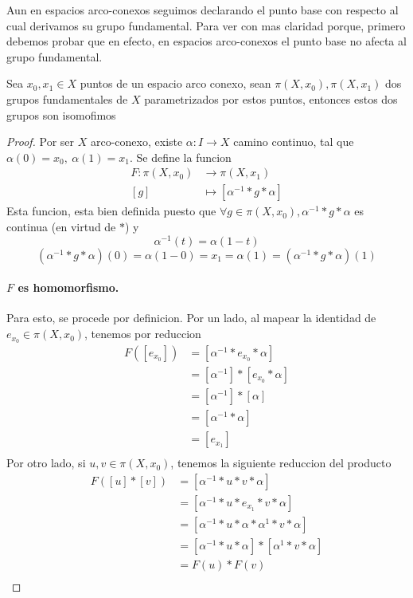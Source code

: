 Aun en espacios arco-conexos seguimos declarando el punto base con
respecto al cual derivamos su grupo fundamental. Para ver con mas
claridad porque, primero debemos probar que en efecto, en espacios
arco-conexos el punto base no afecta al grupo fundamental.
\begin{teorema}
  Sea \(x_0 , x_1 \in X\) puntos de un espacio arco conexo, sean \(\pi
  (X, x_0), \pi (X, x_1)\) dos grupos fundamentales de \(X\)
  parametrizados por estos puntos, entonces estos dos grupos son isomofimos
\end{teorema}
\begin{proof}
  Por ser \(X\) arco-conexo, existe \(\alpha : I \to X\) camino
  continuo, tal que \(\alpha (0) = x_0,\ \alpha (1) = x_1\). Se define
  la funcion
  \begin{align*}
    F : \pi (X, x_0) &\to \pi (X, x_1) \\
    [g] &\mapsto [ \alpha^{-1} * g * \alpha ]
  \end{align*}
  Esta funcion, esta bien definida puesto que \(\forall g \in \pi (X,
  x_0), \alpha^{-1} * g * \alpha \) es continua (en virtud de \(*\)) y
  \[ \alpha^{-1} (t) = \alpha (1 - t)\]
  \[(\alpha^{-1} * g * \alpha) (0) = \alpha (1 - 0) = x_1 = \alpha (1) =
    (\alpha^{-1} * g * \alpha) (1)\]

  \paragraph{\(F\) es homomorfismo.} Para esto, se procede por
  definicion. Por un lado, al mapear la identidad de \(e_{x_0} \in \pi
  (X, x_0) \), tenemos por reduccion
  \begin{align*}
    F ([e_{x_0}]) &= [\alpha^{-1} * e_{x_0} * \alpha] \\
                 &= [\alpha^{-1}] * [e_{x_0} * \alpha] \\
                 &= [\alpha^{-1}] * [\alpha] \\
                 &= [\alpha^{-1} * \alpha] \\
                 &= [e_{x_1}] \\
  \end{align*}
  Por otro lado, si \(u,v \in \pi (X, x_0) \), tenemos la siguiente
  reduccion del producto
  \begin{align*}
    F ([u] * [v]) &= [\alpha^{-1} * u * v * \alpha] \\
    &= [\alpha^{-1} * u * e_{x_1} * v * \alpha] \\
    &= [\alpha^{-1} * u * \alpha * \alpha^{1} * v * \alpha] \\
    &= [\alpha^{-1} * u * \alpha ] * [ \alpha^{1} * v * \alpha] \\
    &= F (u) * F (v) \\
  \end{align*}


\end{proof}
